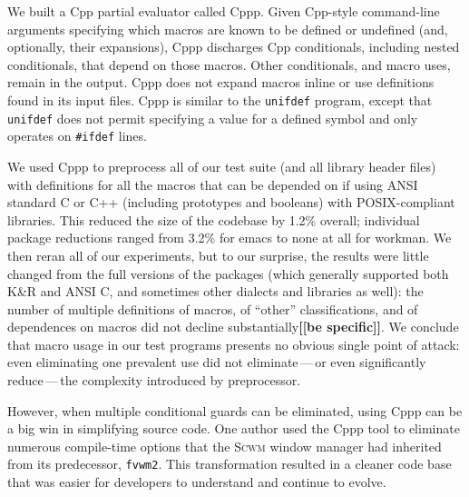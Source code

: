 \documentclass[10pt]{article}
\newcommand{\comment}[1]{\textbf{[[#1]]}}
\newcommand{\pkg}[1]{\textsf{#1}}
\begin{document}
We built a Cpp partial evaluator called Cppp.  Given Cpp-style command-line
arguments specifying which macros are known to be defined or undefined
(and, optionally, their expansions), Cppp discharges Cpp conditionals,
including nested conditionals, that depend on those macros.  Other
conditionals, and macro uses, remain in the output.  Cppp does not expand
macros inline or use definitions found in its input files.  Cppp is similar
to the {\tt unifdef} program, except that {\tt unifdef} does not permit
specifying a value for a defined symbol and only operates on {\tt \#ifdef}
lines.



We used Cppp to preprocess all of our test suite (and all library header
files) with definitions for all the macros that can be depended on if using
ANSI standard C or C++ (including prototypes and booleans) with
POSIX-compliant libraries.
This reduced the size of the codebase by 1.2\% overall; individual package
reductions ranged from 3.2\% for \pkg{emacs} to none at all for \pkg{workman}.
We then reran all of our experiments, but to
our surprise, the
results were little changed from the full versions of the packages (which
generally supported both K\&R and ANSI C, and sometimes other dialects and
libraries as well): the number of multiple definitions of macros, of ``other''
classifications, and of dependences on macros did not decline
substantially\comment{be specific}.  We conclude that macro usage in our test programs presents
no obvious single point of attack: even eliminating one prevalent use did
not eliminate\,---\,or even significantly reduce\,---\,the complexity
introduced by preprocessor.  

However, when multiple conditional guards can be
eliminated, using Cppp can be a big win in simplifying source code.  One 
author used the Cppp tool to eliminate numerous compile-time options that
the \textsc{Scwm} window manager had inherited from its predecessor,
\texttt{fvwm2}.  This transformation resulted in a cleaner code base
that was easier for developers to understand and continue to evolve.
\end{document}
